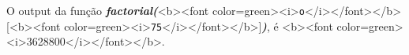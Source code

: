 \documentclass[12pt,varwidth=16cm,border=1pt]{standalone}
\begin{document}
O output da função \textbf{\textit{factorial(}}<b><font color=green><i>\verb+o+</i></font></b>[<b><font color=green><i>\verb+75+</i></font></b>]\textbf{\textit{)}}, é <b><font color=green><i>3628800</i></font></b>.

\questiomtrue
\end{document}
